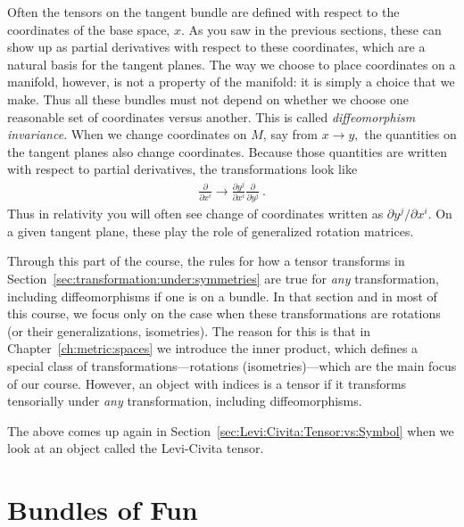 \documentclass[12pt, oneside]{report}    %
\let\oldsection\section
\def\section{%
  \setcounter{sidenote}{1}%
  \oldsection
}
\begin{document}
Often the tensors on the tangent bundle are defined with respect to the coordinates of the base space, $x$. As you saw in the previous sections, these can show up as partial derivatives with respect to these coordinates, which are a natural basis for the tangent planes. The way we choose to place coordinates on a manifold, however, is not a property of the manifold: it is simply a choice that we make. Thus all these bundles must not depend on whether we choose one reasonable set of coordinates versus another. This is called \emph{diffeomorphism invariance}. When we change coordinates on $M$, say from $x\to y,$ the quantities on the tangent planes also change coordinates. Because those quantities are written with respect to partial derivatives, the transformations look like
\begin{align}
    \frac{\partial}{\partial x^i} \to 
    \frac{\partial y^j}{\partial x^i} 
    \frac{\partial}{\partial y^j}  \ .
\end{align}
Thus in relativity you will often see change of coordinates written as ${\partial y^j}/{\partial x^i}$. On a given tangent plane, these play the role of generalized rotation matrices.


\begin{bigidea}
Through this part of the course, the rules for how a tensor transforms in Section~\ref{sec:transformation:under:symmetries} are true for \emph{any} transformation, including diffeomorphisms if one is on a bundle. In that section and in most of this course, we focus only on the case when these transformations are rotations (or their generalizations, isometries). The reason for this is that in Chapter~\ref{ch:metric:spaces} we introduce the inner product, which defines a special class of transformations---rotations (isometries)---which are the main focus of our course. However, an object with indices is a tensor if it transforms tensorially under \emph{any} transformation, including diffeomorphisms. 
\end{bigidea}
The above \bigidearef{} comes up again in Section~\ref{sec:Levi:Civita:Tensor:vs:Symbol} when we look at an object called the Levi-Civita tensor.



\section{Bundles of Fun}
\end{document}
